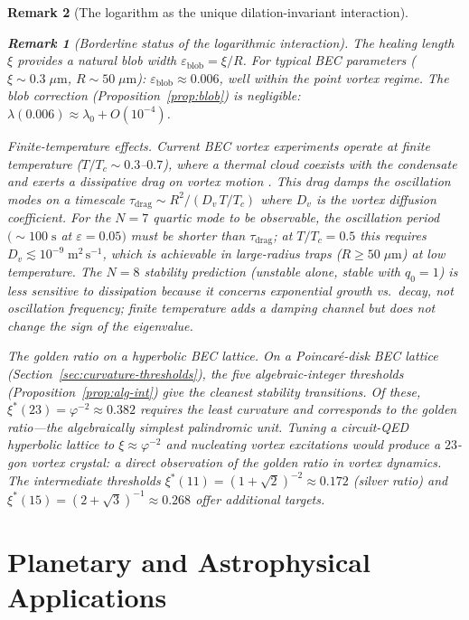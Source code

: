 \documentclass[12pt, a4paper]{article}
\newtheorem{remark}{Remark}[section]
\numberwithin{equation}{section}
\begin{document}
\begin{remark}[The logarithm as the unique dilation-invariant interaction]
\begin{remark}[Borderline status of the logarithmic interaction]
The healing length $\xi$ provides a natural blob width
$\varepsilon_{\mathrm{blob}} = \xi/R$.  For typical BEC parameters
($\xi \sim 0.3\;\mu\mathrm{m}$, $R \sim 50\;\mu\mathrm{m}$):
$\varepsilon_{\mathrm{blob}} \approx 0.006$, well within the point
vortex regime.  The blob correction (Proposition~\ref{prop:blob}) is
negligible: $\lambda(0.006) \approx \lambda_0 + O(10^{-4})$.

\emph{Finite-temperature effects.}  Current BEC vortex experiments
operate at finite temperature ($T/T_c \sim 0.3$--$0.7$), where a
thermal cloud coexists with the condensate and exerts a dissipative
drag on vortex motion \citep{Fetter2009}.  This drag damps the
oscillation modes on a timescale $\tau_{\mathrm{drag}} \sim
R^2/(D_v\,T/T_c)$ where $D_v$ is the vortex diffusion coefficient.
For the $N = 7$ quartic mode to be observable, the oscillation period
$(\sim\!100\;\mathrm{s}$ at $\varepsilon = 0.05)$ must be shorter than
$\tau_{\mathrm{drag}}$; at $T/T_c = 0.5$ this requires
$D_v \lesssim 10^{-9}\;\mathrm{m^2\,s^{-1}}$, which is achievable in
large-radius traps ($R \ge 50\;\mu\mathrm{m}$) at low temperature.
The $N = 8$ stability prediction (unstable alone, stable with $q_0 = 1$)
is less sensitive to dissipation because it concerns exponential growth
vs.\ decay, not oscillation frequency; finite temperature adds a damping
channel but does not change the sign of the eigenvalue.

\emph{The golden ratio on a hyperbolic BEC lattice.}
On a Poincar\'e-disk BEC lattice (Section~\ref{sec:curvature-thresholds}),
the five algebraic-integer thresholds
(Proposition~\ref{prop:alg-int}) give the cleanest stability
transitions.  Of these, $\xi^*(23) = \varphi^{-2} \approx 0.382$
requires the least curvature and corresponds to the golden ratio---the
algebraically simplest palindromic unit.
Tuning a circuit-QED hyperbolic lattice to
$\xi \approx \varphi^{-2}$ and nucleating vortex excitations would
produce a $23$-gon vortex crystal: a direct observation of the
golden ratio in vortex dynamics.  The intermediate thresholds
$\xi^*(11) = (1{+}\sqrt{2})^{-2} \approx 0.172$ (silver ratio)
and $\xi^*(15) = (2{+}\sqrt{3})^{-1} \approx 0.268$ offer
additional targets.

\part{Planetary and Astrophysical Applications}
\label{part:planets}


\end{remark}
\end{remark}
\end{document}
